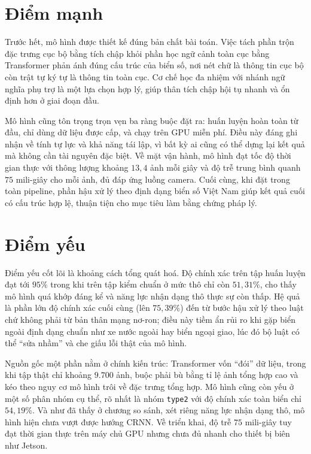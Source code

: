 \documentclass[12pt,a4paper]{report}
\begin{document}
\section{Điểm mạnh}
Trước hết, mô hình được thiết kế đúng bản chất bài toán. Việc tách phần trộn đặc trưng cục bộ bằng tích chập khỏi phần học ngữ cảnh toàn cục bằng Transformer phản ánh đúng cấu trúc của biển số, nơi nét chữ là thông tin cục bộ còn trật tự ký tự là thông tin toàn cục. Cơ chế học đa nhiệm với nhánh ngữ nghĩa phụ trợ là một lựa chọn hợp lý, giúp thân tích chập hội tụ nhanh và ổn định hơn ở giai đoạn đầu.

Mô hình cũng tôn trọng trọn vẹn ba ràng buộc đặt ra: huấn luyện hoàn toàn từ đầu, chỉ dùng dữ liệu được cấp, và chạy trên GPU miễn phí. Điều này đáng ghi nhận về tính tự lực và khả năng tái lập, vì bất kỳ ai cũng có thể dựng lại kết quả mà không cần tài nguyên đặc biệt. Về mặt vận hành, mô hình đạt tốc độ thời gian thực với thông lượng khoảng $13{,}4$ ảnh mỗi giây và độ trễ trung bình quanh $75$ mili-giây cho mỗi ảnh, đủ đáp ứng luồng camera. Cuối cùng, khi đặt trong toàn pipeline, phần hậu xử lý theo định dạng biển số Việt Nam giúp kết quả cuối có cấu trúc hợp lệ, thuận tiện cho mục tiêu làm bằng chứng pháp lý.

\section{Điểm yếu}
Điểm yếu cốt lõi là khoảng cách tổng quát hoá. Độ chính xác trên tập huấn luyện đạt tới $95\%$ trong khi trên tập kiểm chuẩn ở mức thô chỉ còn $51{,}31\%$, cho thấy mô hình quá khớp đáng kể và năng lực nhận dạng thô thực sự còn thấp. Hệ quả là phần lớn độ chính xác cuối cùng (lên $75{,}39\%$) đến từ bước hậu xử lý theo luật chứ không phải từ bản thân mạng nơ-ron; điều này tiềm ẩn rủi ro khi gặp biển ngoài định dạng chuẩn như xe nước ngoài hay biển ngoại giao, lúc đó bộ luật có thể ``sửa nhầm'' và che giấu lỗi thật của mô hình.

Nguồn gốc một phần nằm ở chính kiến trúc: Transformer vốn ``đói'' dữ liệu, trong khi tập thật chỉ khoảng $9{.}700$ ảnh, buộc phải bù bằng tỉ lệ ảnh tổng hợp cao và kéo theo nguy cơ mô hình trôi về đặc trưng tổng hợp. Mô hình cũng còn yếu ở một số phân nhóm cụ thể, rõ nhất là nhóm \texttt{type2} với độ chính xác toàn biển chỉ $54{,}19\%$. Và như đã thấy ở chương so sánh, xét riêng năng lực nhận dạng thô, mô hình hiện chưa vượt được hướng CRNN. Về triển khai, độ trễ $75$ mili-giây tuy đạt thời gian thực trên máy chủ GPU nhưng chưa đủ nhanh cho thiết bị biên như Jetson.
\end{document}

